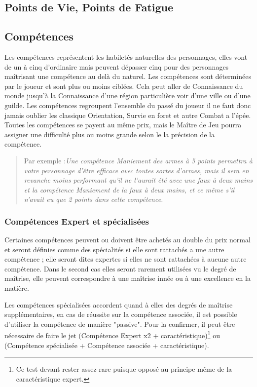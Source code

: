 \subsection{Points de Vie, Points de Fatigue}
\subsection{Compétences}
Les compétences représentent les habiletés naturelles des personnages, 
elles vont de un à cinq d'ordinaire mais peuvent dépasser cinq pour des personnages maîtrisant une compétence au delà du naturel. 
Les compétences sont déterminées par le joueur et sont plus ou moins ciblées. 
Cela peut aller de Connaissance du monde jusqu'à la Connaissance d'une région particulière voir d'une ville ou d'une guilde. 
Les compétences regroupent l'ensemble du passé du joueur il ne faut donc jamais oublier les classique Orientation, Survie en foret et autre Combat a l'épée.\\
Toutes les compétences se payent au même prix, mais le Maître de Jeu pourra assigner une difficulté plus ou moins grande selon le la précision de la compétence.

\begin{quote}
Par exemple :\it Une compétence Maniement des armes à 5 points permettra à votre personnage d'être efficace avec toutes sortes d'armes, 
mais il sera en revanche moins performant qu'il ne l'aurait été avec une faux à deux mains et la compétence Maniement de la faux à deux mains, 
et ce même s'il n'avait eu que 2 points dans cette compétence.
\end{quote} 

\subsubsection{Compétences Expert et spécialisées}
Certaines compétences peuvent ou doivent être achetés au double du prix normal et seront définies comme des spécialités 
si elle sont rattachés a une autre compétence ; elle seront dites expertes si elles ne sont rattachées à aucune autre compétence. 
Dans le second cas elles seront rarement utilisées vu le degré de maîtrise, elle peuvent correspondre à une maîtrise innée ou à une excellence en la matière.

Les compétences spécialisées accordent quand à elles des degrés de maîtrise supplémentaires, en cas de réussite sur la compétence associée, 
il est possible d'utiliser la compétence de manière "passive". Pour la confirmer, il peut être nécessaire de faire le jet 
(Compétence Expert x2 + caractéristique)\footnote{Ce test devant rester assez rare puisque opposé au principe même de la caractéristique expert.}
 ou (Compétence spécialisée + Compétence associée + caractéristique).

